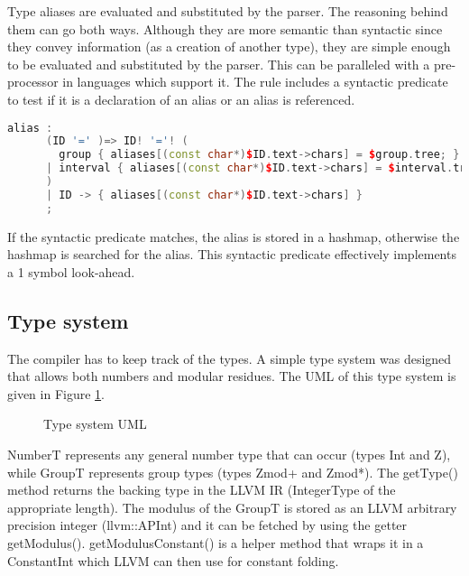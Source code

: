 Type aliases are evaluated and substituted by the parser. The
reasoning behind them can go both ways. Although they are more
semantic than syntactic since they convey information (as a creation
of another type), they are simple enough to be evaluated and
substituted by the parser. This can be paralleled with a pre-processor
in languages which support it. The rule includes a syntactic predicate
to test if it is a declaration of an alias or an alias is referenced.
\begin{lstlisting}[language=C++, keywords={ID, group, interval, alias}]
alias :
      (ID '=' )=> ID! '='! (
        group { aliases[(const char*)$ID.text->chars] = $group.tree; } 
      | interval { aliases[(const char*)$ID.text->chars] = $interval.tree; }
      )
      |	ID -> { aliases[(const char*)$ID.text->chars] }
      ;
\end{lstlisting}
If the syntactic predicate matches, the alias is stored in a hashmap,
otherwise the hashmap is searched for the alias. This syntactic
predicate effectively implements a 1 symbol look-ahead.

\subsection{Type system}

The compiler has to keep track of the types. A simple type system was
designed that allows both numbers and modular residues. The UML of
this type system is given in Figure \ref{fig:type_system}.

\begin{figure}[hb!]
  \centering
  \caption{Type system UML}
  \label{fig:type_system}
\end{figure}

NumberT represents any general number type that can occur (types Int
and Z), while GroupT represents group types (types Zmod+ and Zmod*). The
getType() method returns the backing type in the LLVM IR (IntegerType
of the appropriate length). The modulus of the GroupT is stored as an
LLVM arbitrary precision integer (llvm::APInt) and it can be fetched
by using the getter getModulus(). getModulusConstant() is a helper
method that wraps it in a ConstantInt which LLVM can then use for
constant folding.

